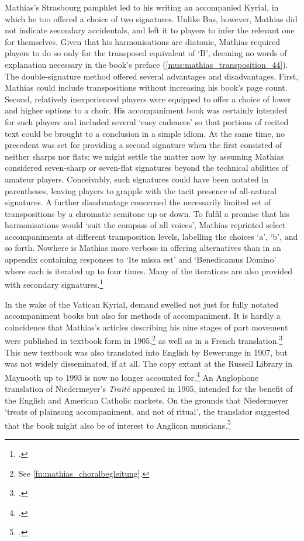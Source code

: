 Mathias's Strasbourg pamphlet led to his writing an accompanied Kyrial, in which he too offered a choice of two signatures.
Unlike Bas, however, Mathias did not indicate secondary accidentals, and left it to players to infer the relevant one for themselves.
Given that his harmonisations are diatonic, Mathias required players to do so only for the transposed equivalent of `B'\kern 1pt\flat{}, deeming no words of explanation necessary in the book's preface (\cref{mus:mathias_transposition_44}).
The double-signature method offered several advantages and disadvantages.
First, Mathias could include transpositions without increasing his book's page count.
Second, relatively inexperienced players were equipped to offer a choice of lower and higher options to a choir.
His accompaniment book was certainly intended for such players and included several `easy cadences' so that portions of recited text could be brought to a conclusion in a simple idiom.
At the same time, no precedent was set for providing a second signature when the first consisted of neither sharps nor flats; we might settle the matter now by assuming Mathias considered seven-sharp or seven-flat signatures beyond the technical abilities of amateur players.
Conceivably, such signatures could have been notated in parentheses, leaving players to grapple with the tacit presence of all-natural signatures.
A further disadvantage concerned the necessarily limited set of transpositions by a chromatic semitone up or down.
To fulfil a promise that his harmonisations would `suit the compass of all voices', Mathias reprinted select accompaniments at different transposition levels, labelling the choices `a', `b', and so forth.
Nowhere is Mathias more verbose in offering alternatives than in an appendix containing responses to `Ite missa est' and `Benedicamus Domino' where each is iterated up to four times.
Many of the iterations are also provided with secondary signatures.\footcite[pp.~29--30, 44, 5*]{MathiasOrganumcomitansad1906}

In the wake of the Vatican Kyrial, demand swelled not just for fully notated accompaniment books but also for methods of accompaniment.
It is hardly a coincidence that Mathias's articles describing his nine stages of part movement were published in textbook form in 1905,\footnote{See \cref{fn:mathias_choralbegleitung}.} as well as in a French translation.\footcite[p.~`a' n.~1]{LeGuennantVademecumparoissial1910}
This new textbook was also translated into English by Bewerunge in 1907, but was not widely disseminated, if at all.
The copy extant at the Russell Library in Maynooth up to 1993 is now no longer accounted for.\footcite[p.~252 n.~191]{McCarthyHeinrichBewerunge18622015}
An Anglophone translation of Niedermeyer's \emph{Traité} appeared in 1905, intended for the benefit of the English and American Catholic markets.
On the grounds that Niedermeyer `treats of plainsong accompaniment, and not of ritual', the translator suggested that the book might also be of interest to Anglican musicians.\footcite[pp.~iii--iv]{NiedermeyerGregorianAccompanimentTheoretical1905}
\nowidow[2]

